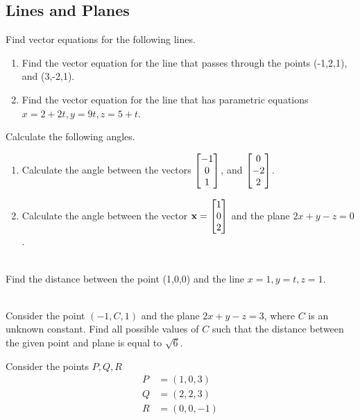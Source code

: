 \subsection{Lines and Planes}


\BEN
\item 
Find vector equations for the following lines.
\begin{enumerate}
\item Find the vector equation for the line that passes through the points (-1,2,1), and (3,-2,1).
\item Find the vector equation for the line that has parametric equations $x=2+2t, y=9t, z=5+t$.
\end{enumerate}
\item 
Calculate the following angles.
\begin{enumerate}
\item Calculate the angle between the vectors $\begin{bmatrix} -1\\ 0 \\ 1 \end{bmatrix}$, and $\begin{bmatrix} 0 \\ -2 \\ 2 \end{bmatrix}$.
\item Calculate the angle between the vector $\mathbf{x}=\begin{bmatrix} 1 \\ 0 \\ 2 \end{bmatrix}$ and the plane $2x+y-z=0$.
\end{enumerate}
\item 
{}\\
Find the distance between the point (1,0,0) and the line $x=1, y=t, z=1$.
\item 
{}\\
Consider the point $(-1,C,1)$ and the plane $2x+y-z=3$, where $C$ is an unknown constant. Find all possible values of $C$ such that the distance between the given point and plane is equal to $\sqrt{6}$. 
\item 
Consider the points $P, Q, R$ \\
\begin{align*}
P &=(1,0,3)\\
Q &=(2,2,3)\\
R &=(0,0,-1)
\end{align*}
